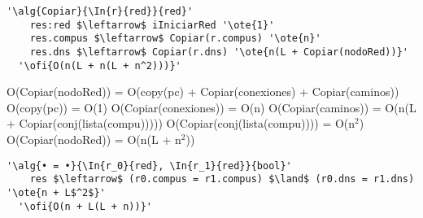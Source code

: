 \begin{lstlisting}[mathescape]
'\alg{Copiar}{\In{r}{red}}{red}'
    res:red $\leftarrow$ iIniciarRed '\ote{1}'
    res.compus $\leftarrow$ Copiar(r.compus) '\ote{n}' 
    res.dns $\leftarrow$ Copiar(r.dns) '\ote{n(L + Copiar(nodoRed))}'
  '\ofi{O(n(L + n(L + n^2)))}'
\end{lstlisting}
O(Copiar(nodoRed)) = O(copy(pc) + Copiar(conexiones) + Copiar(caminos)) \newline
O(copy(pc)) = O(1) \newline
O(Copiar(conexiones)) = O(n)\newline
O(Copiar(caminos)) = O(n(L + Copiar(conj(lista(compu))))) \newline
O(Copiar(conj(lista(compu)))) = O(n$^2$) \newline
O(Copiar(nodoRed)) = O(n(L + n$^2$)) \newline

\begin{lstlisting}[mathescape]
'\alg{• = •}{\In{r_0}{red}, \In{r_1}{red}}{bool}'
    res $\leftarrow$ (r0.compus = r1.compus) $\land$ (r0.dns = r1.dns) '\ote{n + L$^2$}'
  '\ofi{O(n + L(L + n))}'
\end{lstlisting}
